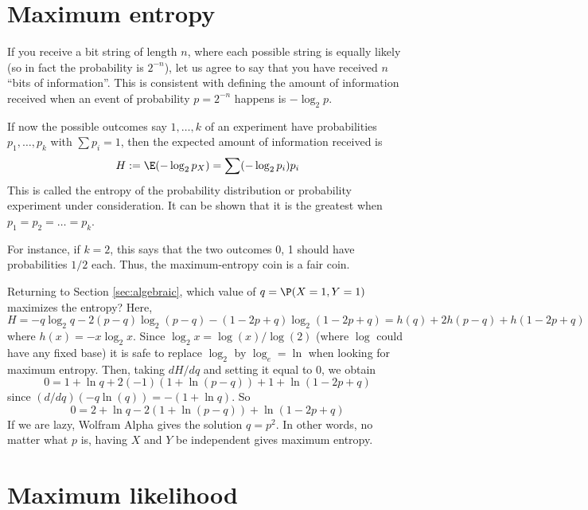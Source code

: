 
\section{Maximum entropy}\label{maxEnt}



If you receive a bit string of length $n$, where each possible string is equally likely (so in fact the probability is $2^{-n}$), let us agree to say that you have received $n$ ``bits of information''.
This is consistent with defining the amount of information received when an event of probability $p=2^{-n}$ happens is $-\log_2 p$.

If now the possible outcomes say $1,\dots,k$ of an experiment have probabilities $p_1,\dots,p_k$ with $\sum p_i=1$, then the expected amount of information received is
\[
	H := \E(-\log_2 p_X) = \sum (-\log_2 p_i)p_i
\]
This is called the entropy of the probability distribution or probability experiment under consideration. It can be shown that it is the greatest when $p_1=p_2=\dots =p_k$.

For instance, if $k=2$, this says that the two outcomes 0, 1 should have probabilities $1/2$ each. Thus, the maximum-entropy coin is a fair coin.

Returning to Section \ref{sec:algebraic}, which value of $q=\P(X=1,Y=1)$ maximizes the entropy?
Here,
\[
	H = -q\log_2 q - 2(p-q)\log_2 (p-q) - (1-2p+q)\log_2(1-2p+q) = h(q)+2h(p-q)+h(1-2p+q)
\]
where $h(x)=-x\log_2 x$.
Since $\log_2 x = \log(x)/\log(2)$ (where $\log$ could have any fixed base) it is safe to replace $\log_2$ by $\log_e=\ln$ when looking for maximum entropy.
Then, taking $dH/dq$ and setting it equal to 0, we obtain
\[
	0 = 1+\ln q + 2(-1)(1+\ln(p-q)) + 1+\ln(1-2p+q)
\]
since $(d/dq)(-q\ln(q)) = -(1+\ln q)$. So
\[
	0 = 2+\ln q - 2(1+\ln(p-q)) + \ln(1-2p+q)
\]
If we are lazy, Wolfram Alpha gives the solution $q=p^2$. In other words, no matter what $p$ is, having $X$ and $Y$ be independent gives maximum entropy.
\section{Maximum likelihood}

